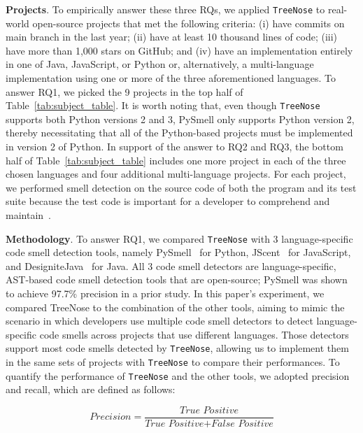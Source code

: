 {\bf Projects}. To empirically answer these three RQs, we applied
\texttt{TreeNose} to real-world open-source projects that met the following
criteria: (i) have commits on main branch in the last year; (ii) have at least
10 thousand lines of code; (iii) have more than 1,000 stars on GitHub; and (iv)
have an implementation entirely in one of Java, JavaScript, or Python or,
alternatively, a multi-language implementation using one or more of the three
aforementioned languages.
%
To answer RQ1, we picked the 9 projects in the top half of
Table~\ref{tab:subject_table}.
%
It is worth noting that, even though \texttt{TreeNose} supports both Python
versions 2 and 3, PySmell only supports Python version 2, thereby necessitating
that all of the Python-based projects must be implemented in version 2 of
Python.
%
In support of the answer to RQ2 and RQ3, the bottom half of
Table~\ref{tab:subject_table} includes one more project in each of the three
chosen languages and four additional multi-language projects.
%
For each project, we performed smell detection on the source code of both the
program and its test suite because the test code is important for a developer
to comprehend and maintain~\cite{ML}.



{\bf Methodology}. To answer RQ1, we compared \texttt{TreeNose} with 3
language-specific code smell detection tools, namely PySmell~\cite{Pysmell} for
Python, JScent~\cite{Jscent} for JavaScript, and
DesigniteJava~\cite{DesigniteJava} for Java. All 3 code smell detectors are
language-specific, AST-based code smell detection tools that are open-source;
PySmell was shown to achieve 97.7\% precision in a prior study.
%
In this paper's experiment, we compared TreeNose to the combination of the
other tools, aiming to mimic the scenario in which developers use multiple code
smell detectors to detect language-specific code smells across projects that
use different languages.
%
Those detectors support most code smells detected by \texttt{TreeNose},
allowing us to implement them in the same sets of projects with
\texttt{TreeNose} to compare their performances. To quantify the performance of
\texttt{TreeNose} and the other tools, we adopted precision and recall, which
are defined as follows:


\begin{equation}
    \textit{Precision} = \frac{\textit{True Positive}}{\textit{True Positive} + \textit{False Positive}}
\end{equation}

